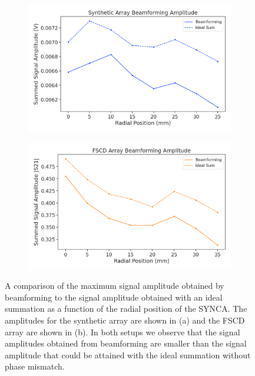 \begin{figure}[htbp]
    \centering
    \begin{subfigure}[b]{0.48\textwidth}
        \includegraphics[width=1\textwidth]{figs/Chapter-5/230509_synth_beamform_amplitude.png}
        \caption{}
        \label{fig:synth-jugaad-bf-amp}
    \end{subfigure}
    \hfill
    \begin{subfigure}[b]{0.48\textwidth}
        \includegraphics[width=1\textwidth]{figs/Chapter-5/230509_fscd_array_beamform_amplitude.png}
        \caption{}
        \label{fig:jugaad-bf-amp}
    \end{subfigure}
    \hfill
    \caption{A comparison of the maximum signal amplitude obtained by beamforming to the signal amplitude obtained with an ideal summation as a function of the radial position of the SYNCA. The amplitudes for the synthetic array are shown in (a) and the FSCD array are shown in (b). In both setups we observe that the signal amplitudes obtained from beamforming are smaller than the signal amplitude that could be attained with the ideal summation without phase mismatch.}
    \label{fig:measured-bf-amp}
\end{figure}

